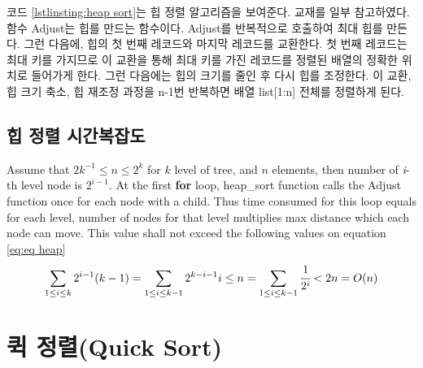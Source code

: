 \documentclass{article}
\begin{document}
코드 \ref{lstlinsting:heap sort}는 힙 정렬 알고리즘을 보여준다. 교재를 일부 참고하였다. 함수 Adjust는 힙를 만드는 함수이다. Adjust를 반복적으로 호출하여 최대 힙를 만든다. 그런 다음에, 힙의 첫 번째 레코드와 마지막 레코드를 교환한다. 첫 번째 레코드는 최대 키를 가지므로 이 교환을 통해 최대 키를 가진 레코드를 정렬된 배열의 정확한 위치로 들어가게 한다. 그런 다음에는 힙의 크기를 줄인 후 다시 힙를 조정한다. 이 교환, 힙 크기 축소, 힙 재조정 과정을 n-1번 반복하면 배열 list[1:n] 전체를 정렬하게 된다.

\subsection{힙 정렬 시간복잡도}
Assume that $2k^{-1}\leq n \leq 2^k$ for $k$ level of tree, and $n$ elements, then number of \textit{i}-th level node is $2^{i-1}$. At the first \textbf{for} loop, heap\_sort function calls the Adjust function once for each node with a child. Thus time consumed for this loop equals for each level, number of nodes for that level multiplies max distance which each node can move. This value shall not exceed the following values on equation \ref{eq:eq heap}
\begin{equation}
\label{eq:eq heap}
\begin{aligned}
    \sum\limits_{1\leq i \leq k}{2^{i-1}(k-1)} 
    = \sum\limits_{1\leq i \leq k-1}{2^{k-i-1}i} 
    \leq n = \sum\limits_{1\leq i \leq k-1}{\cfrac{1}{2^i}} < 2n = O(n)
\end{aligned}
\end{equation}

\section{퀵 정렬(Quick Sort)}
\end{document}
